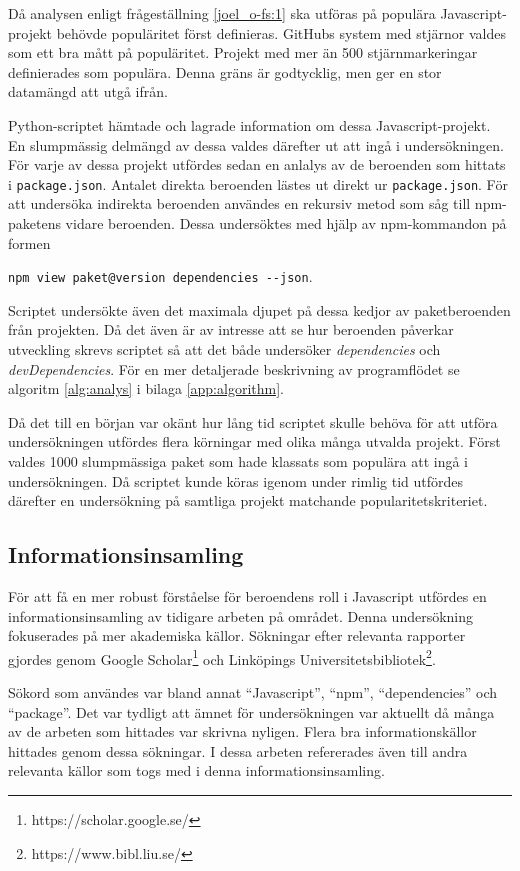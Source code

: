 Då analysen enligt frågeställning \ref{joel_o-fs:1} ska utföras på populära Javascript-projekt behövde populäritet först definieras. GitHubs system med stjärnor valdes som ett bra mått på populäritet. Projekt med mer än 500 stjärnmarkeringar definierades som populära. Denna gräns är godtycklig, men ger en stor datamängd att utgå ifrån.

Python-scriptet hämtade och lagrade information om dessa Javascript-projekt. En slumpmässig delmängd av dessa valdes därefter ut att ingå i undersökningen. För varje av dessa projekt utfördes sedan en anlalys av de beroenden som hittats i \texttt{package.json}. Antalet direkta beroenden lästes ut direkt ur \texttt{package.json}. För att undersöka indirekta beroenden användes en rekursiv metod som såg till npm-paketens vidare beroenden. Dessa undersöktes med hjälp av npm-kommandon på formen

\begin{center}
  \texttt{npm view paket@version dependencies \hyphen\hyphen json}.
\end{center}

Scriptet undersökte även det maximala djupet på dessa kedjor av paketberoenden från projekten. Då det även är av intresse att se hur beroenden påverkar utveckling skrevs scriptet så att det både undersöker \textit{dependencies} och \textit{devDependencies}. För en mer detaljerade beskrivning av programflödet se algoritm \ref{alg:analys} i bilaga \ref{app:algorithm}.

Då det till en början var okänt hur lång tid scriptet skulle behöva för att utföra undersökningen utfördes flera körningar med olika många utvalda projekt. Först valdes 1000 slumpmässiga paket som hade klassats som populära att ingå i undersökningen. Då scriptet kunde köras igenom under rimlig tid utfördes därefter en undersökning på samtliga projekt matchande popularitetskriteriet.

\subsection{Informationsinsamling}
För att få en mer robust förståelse för beroendens roll i Javascript utfördes en informationsinsamling av tidigare arbeten på området. Denna undersökning fokuserades på mer akademiska källor. Sökningar efter relevanta rapporter gjordes genom Google Scholar\footnote{https://scholar.google.se/} och Linköpings Universitetsbibliotek\footnote{https://www.bibl.liu.se/}.

Sökord som användes var bland annat ``Javascript'', ``npm'', ``dependencies'' och ``package''. Det var tydligt att ämnet för undersökningen var aktuellt då många av de arbeten som hittades var skrivna nyligen. Flera bra informationskällor hittades genom dessa sökningar. I dessa arbeten refererades även till andra relevanta källor som togs med i denna informationsinsamling.

